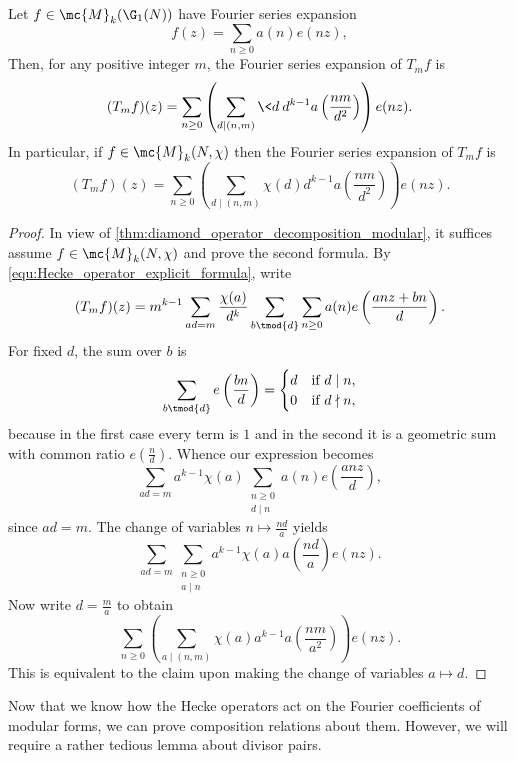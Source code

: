\documentclass[12pt]{article}
\begin{document}
      \begin{proposition}\label{prop:Hecke_operators_on_Fourier_coefficients}
        Let \(f \in \mc{M}_{k}(\G_{1}(N))\) have Fourier series expansion
        \[
          f(z) = \sum_{n \ge 0}a(n)e(nz),
        \]
        Then, for any positive integer \(m\), the Fourier series expansion of \(T_{m}f\) is
        \[
          (T_{m}f)(z) = \sum_{n \ge 0}\left(\sum_{d \mid (n,m)}\<d\>d^{k-1}a\left(\frac{nm}{d^{2}}\right)\right)e(nz).
        \]
        In particular, if \(f \in \mc{M}_{k}(N,\chi)\) then the Fourier series expansion of \(T_{m}f\) is
        \[
          (T_{m}f)(z) = \sum_{n \ge 0}\left(\sum_{d \mid (n,m)}\chi(d)d^{k-1}a\left(\frac{nm}{d^{2}}\right)\right)e(nz).
        \]
      \end{proposition}
      \begin{proof}
        In view of \cref{thm:diamond_operator_decomposition_modular}, it suffices assume \(f \in \mc{M}_{k}(N,\chi)\) and prove the second formula. By \cref{equ:Hecke_operator_explicit_formula}, write
        \[
          (T_{m}f)(z) = m^{k-1}\sum_{ad = m}\frac{\chi(a)}{d^{k}}\sum_{b \tmod{d}}\sum_{n \ge 0}a(n)e\left(\frac{anz+bn}{d}\right).
        \]
        For fixed \(d\), the sum over \(b\) is
        \[
          \sum_{b \tmod{d}}e\left(\frac{bn}{d}\right) = \begin{cases} d & \text{if \(d \mid n\)}, \\ 0 & \text{if \(d \nmid n\)}, \end{cases}
        \]
        because in the first case every term is \(1\) and in the second it is a geometric sum with common ratio \(e\left(\frac{n}{d}\right)\).
        Whence our expression becomes
        \[
          \sum_{ad = m}a^{k-1}\chi(a)\sum_{\substack{n \ge 0 \\ d \mid n}}a(n)e\left(\frac{anz}{d}\right),
        \]
        since \(ad = m\). The change of variables \(n \mapsto \frac{nd}{a}\) yields
        \[
         \sum_{ad = m}\sum_{\substack{n \ge 0 \\ a \mid n}}a^{k-1}\chi(a)a\left(\frac{nd}{a}\right)e(nz).
        \]
        Now write \(d = \frac{m}{a}\) to obtain
        \[
        \sum_{n \ge 0}\left(\sum_{a \mid (n,m)}\chi(a)a^{k-1}a\left(\frac{nm}{a^{2}}\right)\right)e(nz).
        \]
        This is equivalent to the claim upon making the change of variables \(a \mapsto d\).
      \end{proof}

      Now that we know how the Hecke operators act on the Fourier coefficients of modular forms, we can prove composition relations about them. However, we will require a rather tedious lemma about divisor pairs.
\end{document}
